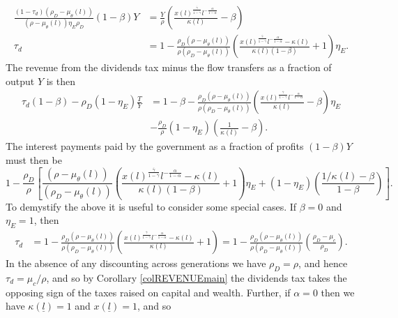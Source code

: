 \documentclass[11pt]{article}
\theoremstyle{plain}
\begin{document}
\begin{align*}
\frac{(1-\tau_d)(\rho_D - \mu_{\theta}(l))}{(\rho - \mu_{\theta}(l))\eta_E \rho_D}(1-\beta)Y & = \frac{Y}{\rho}{\left( \frac{x(l)^{\frac{\overline{\gamma}}{1-\overline{\gamma}}}l^{-\frac{\alpha}{1-\alpha}}}{\kappa(l)} - \beta\right)}
\\ \tau_d & = 1 - \frac{\rho_D(\rho - \mu_{\theta}(l))}{\rho(\rho_D - \mu_{\theta}(l))}{\left( \frac{x(l)^{\frac{\overline{\gamma}}{1-\overline{\gamma}}}l^{-\frac{\alpha}{1-\alpha}}-\kappa(l)}{\kappa(l)(1-\beta)} + 1\right)}\eta_E.
\end{align*}
The revenue from the dividends tax minus the flow transfers as a fraction of output $Y$ is then
\begin{align*}
\tau_d(1-\beta) - \rho_D(1-\eta_E)\frac{T}{Y} & = 1 - \beta - \frac{\rho_D(\rho - \mu_{\theta}(l))}{\rho(\rho_D - \mu_{\theta}(l))}{\left( \frac{x(l)^{\frac{\overline{\gamma}}{1-\overline{\gamma}}}l^{-\frac{\alpha}{1-\alpha}}}{\kappa(l)} - \beta\right)}\eta_E
\\ & - \frac{\rho_D}{\rho}(1-\eta_E){\left(\frac{1}{\kappa(l)} - \beta \right)}.
\end{align*}
The interest payments paid by the government as a fraction of profits $(1-\beta)Y$ must then be 
\begin{equation}
1 - \frac{\rho_D}{\rho}{\left[\frac{(\rho - \mu_{\theta}(l))}{(\rho_D - \mu_{\theta}(l))}{\left( \frac{x(l)^{\frac{\overline{\gamma}}{1-\overline{\gamma}}}l^{-\frac{\alpha}{1-\alpha}}-\kappa(l)}{\kappa(l)(1-\beta)} + 1\right)} \eta_E + (1-\eta_E){\left(\frac{1/\kappa(l) - \beta}{1-\beta} \right)} \right]}.
\label{interestDY}
\end{equation}
To demystify the above it is useful to consider some special cases. If $\beta = 0$ and $\eta_E = 1$, then
\begin{align*}
\tau_d & = 1 - \frac{\rho_D(\rho - \mu_{\theta}(l))}{\rho(\rho_D - \mu_{\theta}(l))}{\left( \frac{x(l)^{\frac{\overline{\gamma}}{1-\overline{\gamma}}}l^{-\frac{\alpha}{1-\alpha}}-\kappa(l)}{\kappa(l)} + 1\right)} = 1 - \frac{\rho_D(\rho - \mu_{\theta}(l))}{\rho(\rho_D - \mu_{\theta}(l))} {\left(\frac{\rho_D - \mu_c}{\rho_D}\right)}.
\end{align*} 
In the absence of any discounting across generations we have $\rho_D = \rho$, and hence $\tau_d = \mu_c/\rho$, and so by Corollary \ref{colREVENUEmain} the dividends tax takes the opposing sign of the taxes raised on capital and wealth. Further, if $\alpha = 0$ then we have $\kappa(\underline{l}) = 1$ and $x(\underline{l}) = 1$, and so
\end{document}
